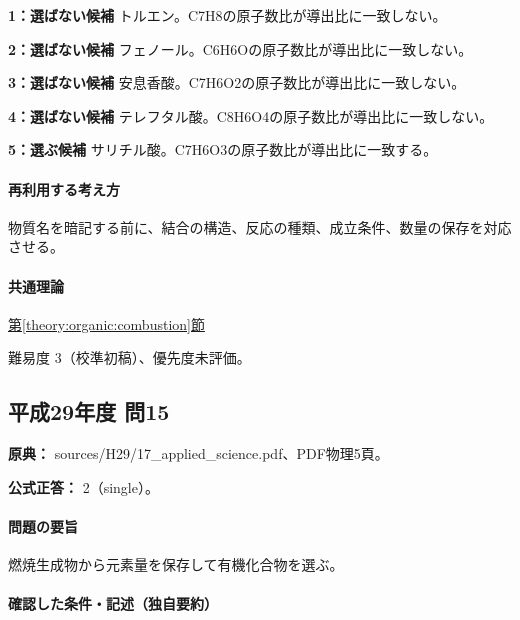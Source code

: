 \noindent\textbf{1：選ばない候補} トルエン。C7H8の原子数比が導出比に一致しない。\par

\noindent\textbf{2：選ばない候補} フェノール。C6H6Oの原子数比が導出比に一致しない。\par

\noindent\textbf{3：選ばない候補} 安息香酸。C7H6O2の原子数比が導出比に一致しない。\par

\noindent\textbf{4：選ばない候補} テレフタル酸。C8H6O4の原子数比が導出比に一致しない。\par

\noindent\textbf{5：選ぶ候補} サリチル酸。C7H6O3の原子数比が導出比に一致する。\par

\paragraph{再利用する考え方} 物質名を暗記する前に、結合の構造、反応の種類、成立条件、数量の保存を対応させる。

\paragraph{共通理論} \hyperref[theory:organic:combustion]{第\ref*{theory:organic:combustion}節}

\par 難易度 3（校準初稿）、優先度未評価。

\subsection{平成29年度 問15}
\label{q:h29-reg-applied-15}

\noindent\textbf{原典：} sources/H29/17\_applied\_science.pdf、PDF物理5頁。

\textbf{公式正答：} 2（single）。

\paragraph{問題の要旨} 燃焼生成物から元素量を保存して有機化合物を選ぶ。

\paragraph{確認した条件・記述（独自要約）}\mbox{}\par

